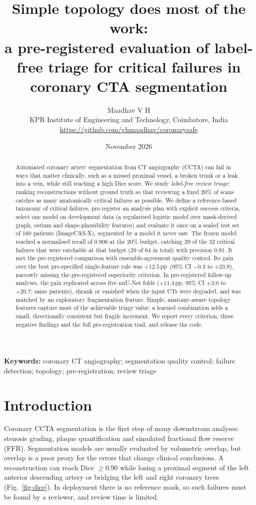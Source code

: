 \documentclass[11pt]{article}
\title{\textbf{Simple topology does most of the work:\\ a pre-registered evaluation of label-free triage for critical failures in coronary CTA segmentation}}
\author{Maadhav V H\\[2pt]
\small KPR Institute of Engineering and Technology, Coimbatore, India\\
\small \url{https://github.com/vhmaadhav/coronarysafe}}
\date{November 2026}
\newcommand{\pp}{\,pp}
\begin{document}
\maketitle

\begin{abstract}
Automated coronary artery segmentation from CT angiography (CCTA) can fail in ways that matter clinically, such as a missed proximal vessel, a broken trunk or a leak into a vein, while still reaching a high Dice score. We study \emph{label-free review triage}: ranking reconstructions without ground truth so that reviewing a fixed 20\% of scans catches as many anatomically critical failures as possible. We define a reference-based taxonomy of critical failures, pre-register an analysis plan with explicit success criteria, select one model on development data (a regularised logistic model over mask-derived graph, ostium and shape-plausibility features) and evaluate it once on a sealed test set of 160 patients (ImageCAS-X), segmented by a model it never saw. The frozen model reached a normalised recall of 0.906 at the 20\% budget, catching 29 of the 32 critical failures that were catchable at that budget (29 of 64 in total) with precision 0.91. It met the pre-registered comparison with ensemble-agreement quality control. Its gain over the best pre-specified single-feature rule was $+12.5$\pp\ (95\% CI $-0.3$ to $+23.9$), narrowly missing the pre-registered superiority criterion. In pre-registered follow-up analyses, the gain replicated across five nnU-Net folds ($+11.4$\pp, 95\% CI $+3.0$ to $+20.7$; same patients), shrank or vanished when the input CTs were degraded, and was matched by an exploratory fragmentation feature. Simple, anatomy-aware topology features capture most of the achievable triage value; a learned combination adds a small, directionally consistent but fragile increment. We report every criterion, three negative findings and the full pre-registration trail, and release the code.
\end{abstract}

\noindent\textbf{Keywords:} coronary CT angiography; segmentation quality control; failure detection; topology; pre-registration; review triage

\section{Introduction}
Coronary CCTA segmentation is the first step of many downstream analyses: stenosis grading, plaque quantification and simulated fractional flow reserve (FFR). Segmentation models are usually evaluated by volumetric overlap, but overlap is a poor proxy for the errors that change clinical conclusions. A reconstruction can reach Dice $\geq 0.90$ while losing a proximal segment of the left anterior descending artery or bridging the left and right coronary trees (Fig.~\ref{fig:dice}). In deployment there is no reference mask, so such failures must be found by a reviewer, and review time is limited.
\end{document}
